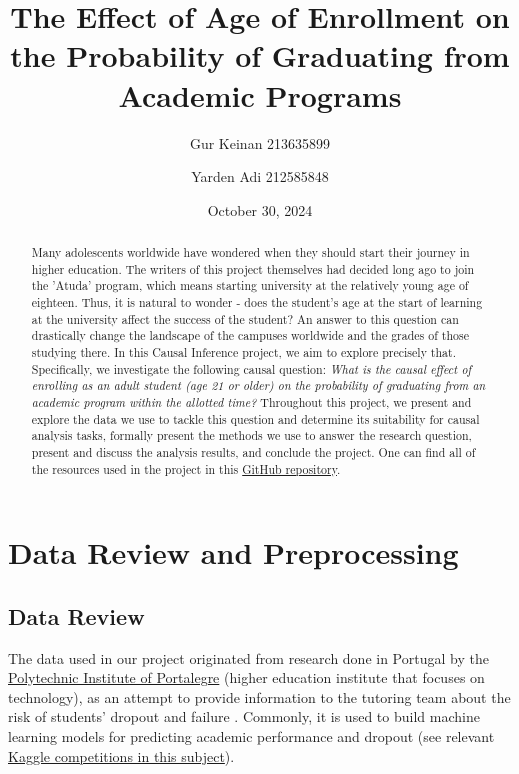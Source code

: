 \documentclass{article}
\title{The Effect of Age of Enrollment on the Probability of Graduating from Academic Programs}
\author{Gur Keinan 213635899 \and Yarden Adi 212585848}
\date{October 30, 2024}
\newcommand{\gur}[1]{{\color{teal}{Gur: #1}}}
\begin{document}
\maketitle

\begin{abstract}
    Many adolescents worldwide have wondered when they should start their journey in higher education. The writers of this project themselves had decided long ago to join the 'Atuda' program, which means starting university at the relatively young age of eighteen. Thus, it is natural to wonder - does the student's age at the start of learning at the university affect the success of the student? An answer to this question can drastically change the landscape of the campuses worldwide and the grades of those studying there. In this Causal Inference project, we aim to explore precisely that. Specifically, we investigate the following causal question: \emph{What is the causal effect of enrolling as an adult student (age 21 or older) on the probability of graduating from an academic program within the allotted time?} Throughout this project, we present and explore the data we use to tackle this question and determine its suitability for causal analysis tasks, formally present the methods we use to answer the research question, present and discuss the analysis results, and conclude the project. One can find all of the resources used in the project in this \href{https://github.com/GurKeinan/Causal-Inference-Project-Effect-of-Age-on-Graduating}{GitHub repository}.
\end{abstract}


\section{Data Review and Preprocessing}

\gur{Opening sentence.}

\subsection{Data Review}

The data used in our project originated from research done in Portugal by the \href{https://www.ipportalegre.pt/pt/}{Polytechnic Institute of Portalegre} (higher education institute that focuses on technology), as an attempt to provide information to the tutoring team about the risk of students' dropout and failure \citep{data7110146}. Commonly, it is used to build machine learning models for predicting academic performance and dropout (see relevant \href{https://www.kaggle.com/datasets/ankanhore545/dropout-or-academic-success/data}{Kaggle competitions in this subject}).
\end{document}
